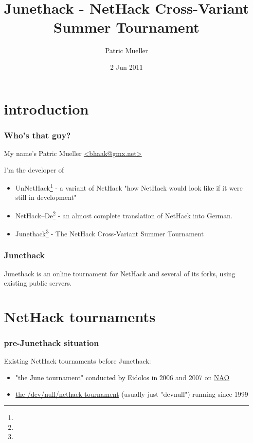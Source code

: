 \documentclass{beamer}
\title{Junethack - NetHack Cross-Variant Summer Tournament}
\author{Patric Mueller}
\date{2 Jun 2011}
\begin{document}
\begin{frame}
\titlepage
\end{frame}

\section[outline]{}
\frame{\tableofcontents}

\section{introduction}
\begin{frame}
\frametitle{Who's that guy?}
My name's Patric Mueller \href{mailto:bhaak@gmx.net}{<bhaak@gmx.net>} \pause

I'm the developer of \pause

  \begin{itemize}[<+->]
    \item UnNetHack\footnote{} - a variant of NetHack "how NetHack would look like if it were still in development"
    \item NetHack--De\footnote{} - an almost complete translation of NetHack into German.
    \item Junethack\footnote{} - The NetHack Cross-Variant Summer Tournament
  \end{itemize}
\end{frame}

\begin{frame}
\frametitle{Junethack}
Junethack is an online tournament for NetHack and several of its forks, using existing public servers.
\end{frame}

\section{NetHack tournaments}
\begin{frame}
\frametitle{pre-Junethack situation}
  Existing NetHack tournaments before Junethack:\pause
  \begin{itemize}[<+->]
    \item "the June tournament" conducted by Eidolos in 2006 and 2007 on \href{http://nethack.alt.org/}{NAO}
    \item \href{http://nethack.devnull.net/}{the /dev/null/nethack tournament} (usually just "devnull") running since 1999
  \end{itemize}
\end{frame}
\end{document}
